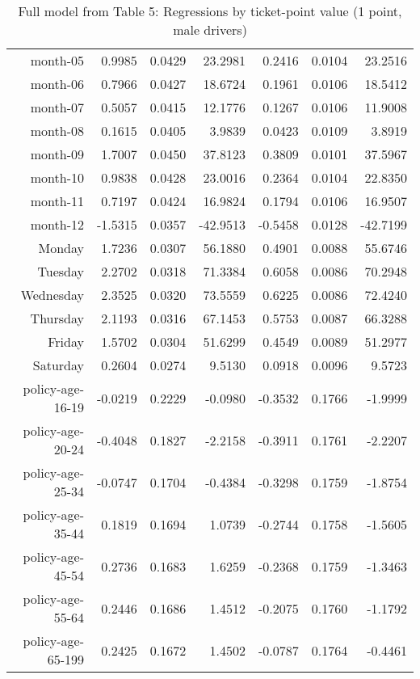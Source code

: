\documentclass[10pt]{article}
\begin{document}
\begin{table}[ht]
\begin{tabular}{rrrrrrr}
  month-05 & 0.9985 & 0.0429 & 23.2981 & 0.2416 & 0.0104 & 23.2516 \\ 
  month-06 & 0.7966 & 0.0427 & 18.6724 & 0.1961 & 0.0106 & 18.5412 \\ 
  month-07 & 0.5057 & 0.0415 & 12.1776 & 0.1267 & 0.0106 & 11.9008 \\ 
  month-08 & 0.1615 & 0.0405 & 3.9839 & 0.0423 & 0.0109 & 3.8919 \\ 
  month-09 & 1.7007 & 0.0450 & 37.8123 & 0.3809 & 0.0101 & 37.5967 \\ 
  month-10 & 0.9838 & 0.0428 & 23.0016 & 0.2364 & 0.0104 & 22.8350 \\ 
  month-11 & 0.7197 & 0.0424 & 16.9824 & 0.1794 & 0.0106 & 16.9507 \\ 
  month-12 & -1.5315 & 0.0357 & -42.9513 & -0.5458 & 0.0128 & -42.7199 \\ 
  Monday & 1.7236 & 0.0307 & 56.1880 & 0.4901 & 0.0088 & 55.6746 \\ 
  Tuesday & 2.2702 & 0.0318 & 71.3384 & 0.6058 & 0.0086 & 70.2948 \\ 
  Wednesday & 2.3525 & 0.0320 & 73.5559 & 0.6225 & 0.0086 & 72.4240 \\ 
  Thursday & 2.1193 & 0.0316 & 67.1453 & 0.5753 & 0.0087 & 66.3288 \\ 
  Friday & 1.5702 & 0.0304 & 51.6299 & 0.4549 & 0.0089 & 51.2977 \\ 
  Saturday & 0.2604 & 0.0274 & 9.5130 & 0.0918 & 0.0096 & 9.5723 \\ 
  policy-age-16-19 & -0.0219 & 0.2229 & -0.0980 & -0.3532 & 0.1766 & -1.9999 \\ 
  policy-age-20-24 & -0.4048 & 0.1827 & -2.2158 & -0.3911 & 0.1761 & -2.2207 \\ 
  policy-age-25-34 & -0.0747 & 0.1704 & -0.4384 & -0.3298 & 0.1759 & -1.8754 \\ 
  policy-age-35-44 & 0.1819 & 0.1694 & 1.0739 & -0.2744 & 0.1758 & -1.5605 \\ 
  policy-age-45-54 & 0.2736 & 0.1683 & 1.6259 & -0.2368 & 0.1759 & -1.3463 \\ 
  policy-age-55-64 & 0.2446 & 0.1686 & 1.4512 & -0.2075 & 0.1760 & -1.1792 \\ 
  policy-age-65-199 & 0.2425 & 0.1672 & 1.4502 & -0.0787 & 0.1764 & -0.4461 \\ 
   \hline
\end{tabular}
\caption{Full model from Table 5: Regressions by ticket-point value (1 point, male drivers)} 
\label{tab_5_1_pts_M}
\end{table}
\end{document}
